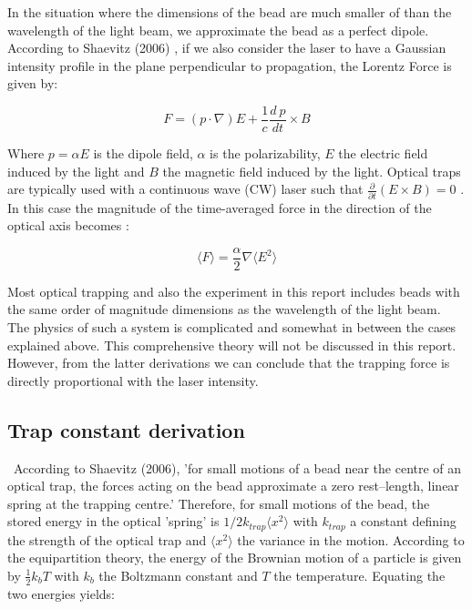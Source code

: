 In the situation where the dimensions of the bead are much smaller of than the wavelength of the light beam, we approximate the bead as a perfect dipole. According to Shaevitz (2006) , if we also consider the laser to have a Gaussian intensity profile in the plane perpendicular to propagation, the Lorentz Force is given by:


\begin{equation}
	F  =  (p \cdot \nabla)E + \frac{1}{c} \frac{d \: p}{dt} \times B
\end{equation}

Where $ p = \alpha E $ is the dipole field, $\alpha $ is the polarizability, $E$ the electric field induced by the light and $B$ the magnetic field induced by the light. Optical traps are typically used with a continuous wave (CW) laser such that $ \frac{\partial}{\partial t}(E \times B) = 0 $ . In this case the magnitude of the time-averaged force in the direction of the optical axis becomes \cite{shaevitz}:

\begin{equation}
	\big \langle F \big \rangle  = \frac{ \alpha }{2} \nabla \big \langle E^2 \big \rangle
\end{equation}

Most optical trapping and also the experiment in this report includes beads with the same order of magnitude dimensions as the wavelength of the light beam. The physics of such a system is complicated and somewhat in between the cases explained above. This comprehensive theory will not be discussed in this report. However, from the latter derivations we can conclude that the trapping force is directly proportional with the laser intensity. \

\subsection{Trap constant derivation}
\label{trap_constant}
\
According to Shaevitz (2006), 'for small motions of a bead near the centre of an optical trap, the forces acting on the bead approximate a zero rest–length, linear spring at the trapping centre.' Therefore, for small motions of the bead, the stored energy in the optical 'spring' is $1/2 k_{trap} \langle x^2 \rangle $ with $k_{trap}$ a constant defining the strength of the optical trap and $ \langle x^2 \rangle $ the variance in the motion. According to the equipartition theory, the energy of the Brownian motion of a particle is given by $\frac{1}{2} k_b T $ with $ k_b $ the Boltzmann constant and $T$ the temperature.\cite{shaevitz} Equating the two energies yields:

